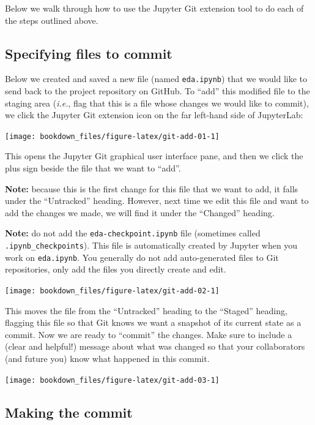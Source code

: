 \documentclass[
]{krantz}
\renewenvironment{quote}{\begin{VF}}{\end{VF}}
\begin{document}
Below we walk through how to use the Jupyter Git extension tool to do
each of the steps outlined above.

\hypertarget{specifying-files-to-commit}{%
\subsection{Specifying files to commit}\label{specifying-files-to-commit}}

Below we created and saved a new file (named \texttt{eda.ipynb}) that we would
like to send back to the project repository on GitHub.
To ``add'' this modified file to the staging area (\emph{i.e.}, flag that this is a
file whose changes we would like to commit), we click the Jupyter Git extension
icon on the far left-hand side of JupyterLab:

\texttt{[image: bookdown\_files/figure-latex/git-add-01-1]}

This opens the Jupyter Git graphical user interface pane, and then we
click the plus sign beside the file that we want to ``add''.

\begin{quote}
\textbf{Note:} because this is the first change for this file that we want to add, it falls under the
``Untracked'' heading. However, next time we edit this file and want to add the
changes we made, we will find it under the ``Changed'' heading.
\end{quote}

\begin{quote}
\textbf{Note:} do not add the \texttt{eda-checkpoint.ipynb} file (sometimes called \texttt{.ipynb\_checkpoints}). This file is
automatically created by Jupyter when you work on \texttt{eda.ipynb}. You generally do not add auto-generated files to Git repositories,
only add the files you directly create and edit.
\end{quote}

\texttt{[image: bookdown\_files/figure-latex/git-add-02-1]}

This moves the file from the ``Untracked'' heading to the ``Staged'' heading,
flagging this file so that Git knows we want a snapshot of its current state as a commit.
Now we are ready to ``commit'' the changes. Make sure to include a (clear and helpful!) message about what was changed
so that your collaborators (and future you) know what happened in this commit.

\texttt{[image: bookdown\_files/figure-latex/git-add-03-1]}

\hypertarget{making-the-commit}{%
\subsection{Making the commit}\label{making-the-commit}}
\end{document}
